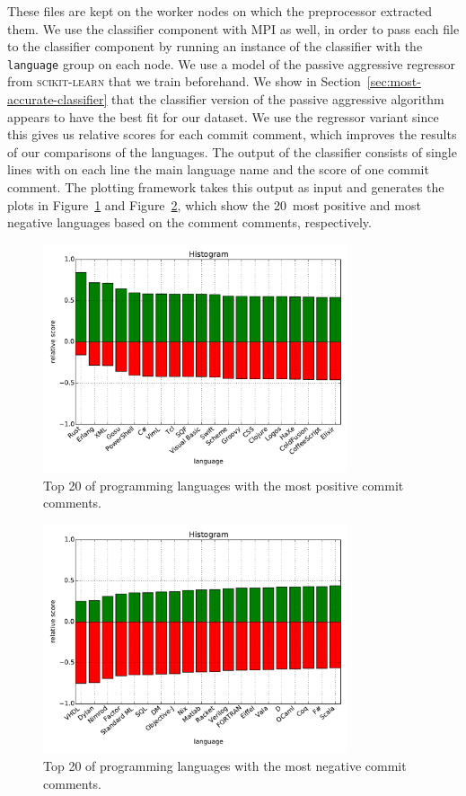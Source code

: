 \documentclass{article}
\begin{document}
These files are kept on the worker nodes on which the preprocessor extracted 
them. We use the classifier component with MPI as well, in order to pass each 
file to the classifier component by running an instance of the classifier with 
the {\tt language} group on each node. We use a model of the passive aggressive 
regressor from \textsc{scikit-learn} that we train beforehand. We show in 
Section~\ref{sec:most-accurate-classifier} that the classifier version of the 
passive aggressive algorithm appears to have the best fit for our dataset. We 
use the regressor variant since this gives us relative scores for each commit 
comment, which improves the results of our comparisons of the languages. The
output of the classifier consists of single lines with on each line the main
language name and the score of one commit comment. The plotting framework
takes this output as input and generates the plots in 
Figure~\ref{fig:language-pos} and Figure~\ref{fig:language-neg}, which show
the 20~most positive and most negative languages based on the comment
comments, respectively.

\begin{figure}[h!]
  \centering
  \includegraphics[width=0.8\textwidth]{Images/Positive_languages_passive_aggressive.pdf}
  \caption{Top 20 of programming languages with the most positive commit comments.}\label{fig:language-pos}
\end{figure}

\begin{figure}[h!]
  \centering
  \includegraphics[width=0.8\textwidth]{Images/Negative_languages_passive_aggressive.pdf}
  \caption{Top 20 of programming languages with the most negative commit 
  comments.}\label{fig:language-neg}
\end{figure}
\end{document}
